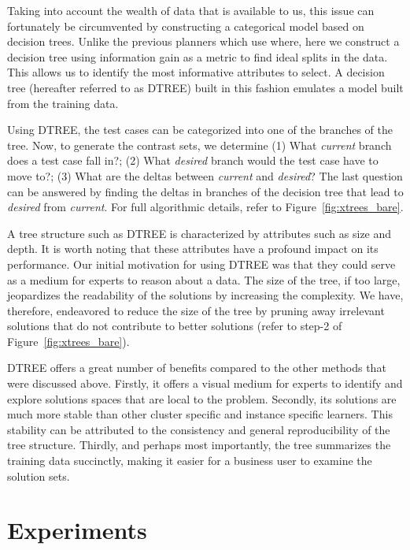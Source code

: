 \documentclass{sig-alternate}
\newcommand{\fig}[1]{Figure~\ref{fig:#1}}
\begin{document}
Taking into account the wealth of data that is available to us, this issue can fortunately be circumvented by constructing a categorical model based on decision trees. Unlike the previous planners which use where, here we construct a decision tree using information gain as a metric to find ideal splits in the data. This allows us to identify the most informative attributes to select. A decision tree (hereafter referred to as DTREE) built in this fashion emulates a model built from the training data. 

Using DTREE, the test cases can be categorized into one of the branches of the tree. Now, to generate the contrast sets, we determine (1) What \textit{current} branch does a test case fall in?; (2) What \textit{desired} branch would the test case have to move to?; (3) What are the deltas between \textit{current} and \textit{desired}? The last question can be answered by finding the deltas in branches of the decision tree that lead to \textit{desired} from \textit{current}. For full algorithmic details, refer to \fig{xtrees_bare}.

A tree structure such as DTREE is characterized by attributes such as size and depth. It is worth noting that these attributes have a profound impact on its performance. Our initial motivation for using DTREE was that they could serve as a medium for experts to reason about a data. The size of the tree, if too large, jeopardizes the readability of the solutions by increasing the complexity. We have, therefore, endeavored to reduce the size of the tree by pruning away irrelevant solutions that do not contribute to better solutions (refer to step-2 of \fig{xtrees_bare}). 

DTREE offers a great number of benefits compared to the other methods that were discussed above. Firstly, it offers a visual medium for experts to identify and explore solutions spaces that are local to the problem. Secondly, its solutions are much more stable than other cluster specific and instance specific learners. This stability can be attributed to the consistency and general reproducibility of the tree structure. Thirdly, and perhaps most importantly, the tree summarizes the training data succinctly, making it easier for a business user to examine the solution sets.

\section{Experiments}
\end{document}
